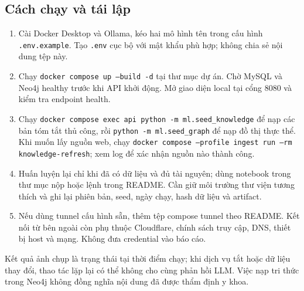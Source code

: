 \subsection{Cách chạy và tái lập}
\begin{enumerate}
\item Cài Docker Desktop và Ollama, kéo hai mô hình tên trong cấu hình \texttt{.env.example}. Tạo \texttt{.env} cục bộ với mật khẩu phù hợp; không chia sẻ nội dung tệp này.
\item Chạy \texttt{docker compose up --build -d} tại thư mục dự án. Chờ MySQL và Neo4j healthy trước khi API khởi động. Mở giao diện local tại cổng 8080 và kiểm tra endpoint health.
\item Chạy \texttt{docker compose exec api python -m ml.seed\_knowledge} để nạp các bản tóm tắt thủ công, rồi \texttt{python -m ml.seed\_graph} để nạp đồ thị thực thể. Khi muốn lấy nguồn web, chạy \texttt{docker compose --profile ingest run --rm knowledge-refresh}; xem log để xác nhận nguồn nào thành công.
\item Huấn luyện lại chỉ khi đã có dữ liệu và đủ tài nguyên; dùng notebook trong thư mục nộp hoặc lệnh trong README. Cần giữ môi trường thư viện tương thích và ghi lại phiên bản, seed, ngày chạy, hash dữ liệu và artifact.
\item Nếu dùng tunnel cấu hình sẵn, thêm tệp compose tunnel theo README. Kết nối từ bên ngoài còn phụ thuộc Cloudflare, chính sách truy cập, DNS, thiết bị host và mạng. Không đưa credential vào báo cáo.
\end{enumerate}
\noindent Kết quả ảnh chụp là trạng thái tại thời điểm chạy; khi dịch vụ tắt hoặc dữ liệu thay đổi, thao tác lặp lại có thể không cho cùng phản hồi LLM. Việc nạp tri thức trong Neo4j không đồng nghĩa nội dung đã được thẩm định y khoa.
